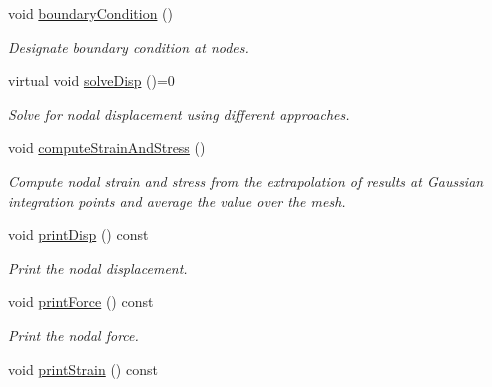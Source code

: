 \begin{DoxyCompactItemize}
void \mbox{\hyperlink{class_analysis_aec157316b08568c84d8d8344a724ff89}{boundary\+Condition}} ()
\begin{DoxyCompactList}\small\item\em Designate boundary condition at nodes. \end{DoxyCompactList}\item 
\mbox{\label{class_analysis_a93e6427625d7441986e8045da772892f}} 
virtual void \mbox{\hyperlink{class_analysis_a93e6427625d7441986e8045da772892f}{solve\+Disp}} ()=0
\begin{DoxyCompactList}\small\item\em Solve for nodal displacement using different approaches. \end{DoxyCompactList}\item 
\mbox{\label{class_analysis_a00c4b54646392d48ea2862ab3987a96d}} 
void \mbox{\hyperlink{class_analysis_a00c4b54646392d48ea2862ab3987a96d}{compute\+Strain\+And\+Stress}} ()
\begin{DoxyCompactList}\small\item\em Compute nodal strain and stress from the extrapolation of results at Gaussian integration points and average the value over the mesh. \end{DoxyCompactList}\item 
\mbox{\label{class_analysis_a6def63bf2890a4d9fa76c1af350703b8}} 
void \mbox{\hyperlink{class_analysis_a6def63bf2890a4d9fa76c1af350703b8}{print\+Disp}} () const
\begin{DoxyCompactList}\small\item\em Print the nodal displacement. \end{DoxyCompactList}\item 
\mbox{\label{class_analysis_add0ccc185311df2140b66590b036b9fb}} 
void \mbox{\hyperlink{class_analysis_add0ccc185311df2140b66590b036b9fb}{print\+Force}} () const
\begin{DoxyCompactList}\small\item\em Print the nodal force. \end{DoxyCompactList}\item 
\mbox{\label{class_analysis_ab3087cac038045cc9cc4b8b8e200d16b}} 
void \mbox{\hyperlink{class_analysis_ab3087cac038045cc9cc4b8b8e200d16b}{print\+Strain}} () const

\end{DoxyCompactItemize}
